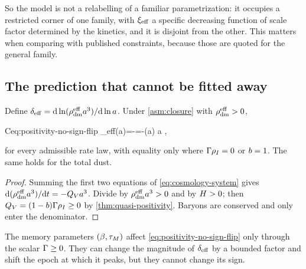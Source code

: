 So the model is not a relabelling of a familiar parametrization: it occupies a
restricted corner of one family, with $\xi_{\mathrm{eff}}$ a specific decreasing function
of scale factor determined by the kinetics, and it is disjoint from the other.
This matters when comparing with published constraints, because those are
quoted for the general family.

\subsection{The prediction that cannot be fitted away}
\label{sec:positivity-no-sign-flip}

\begin{theorem}\label{thm:no-sign-flip}
  Define $\delta_{\rm eff}=\mathrm{d}\ln(\rho_{\mathrm{dm}}^{\mathrm{eff}} a^3)/\mathrm{d}\ln a$. Under
  \cref{asm:closure} with $\rho_{\mathrm{dm}}^{\mathrm{eff}}>0$,
  \begin{keyresult}{C}{eq:positivity-no-sign-flip}
    \delta_{\rm eff}(a)=-\frac{\QV}{\Hub\rhodmeff}=-\xieff(a)
    \qquad{}a ,
  \end{keyresult}
  for every admissible rate law, with equality only where $\Gamma\rho_{I}=0$ or
  $b=1$. The same holds for the total dust.
\end{theorem}

\begin{proof}
  Summing the first two equations of \cref{eq:cosmology-system} gives
  $\mathrm{d}(\rho_{\mathrm{dm}}^{\mathrm{eff}} a^3)/\mathrm{d} t=-Q_{V} a^3$. Divide by $\rho_{\mathrm{dm}}^{\mathrm{eff}} a^3>0$ and by
  $H>0$; then $Q_{V}=(1-b)\Gamma\rho_{I}\ge0$ by
  \cref{thm:quasi-positivity}. Baryons are conserved and only enter the
  denominator.
\end{proof}

\begin{corollary}\label{cor:memory-invisible}
  The memory parameters $(\beta,\tau_{M})$ affect
  \cref{eq:positivity-no-sign-flip} only through the scalar $\Gamma\ge0$. They can
  change the magnitude of $\delta_{\rm eff}$ by a bounded factor and shift the
  epoch at which it peaks, but they cannot change its sign.
\end{corollary}

